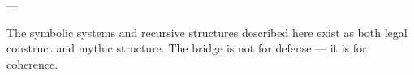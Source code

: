 
---

\begin{tcolorbox}[colback=black!5, colframe=OriaGold, title=\textbf{Bridging Statement}, sharp corners=south]
The symbolic systems and recursive structures described here exist as both legal construct and mythic structure. The bridge is not for defense — it is for coherence.
\end{tcolorbox}

